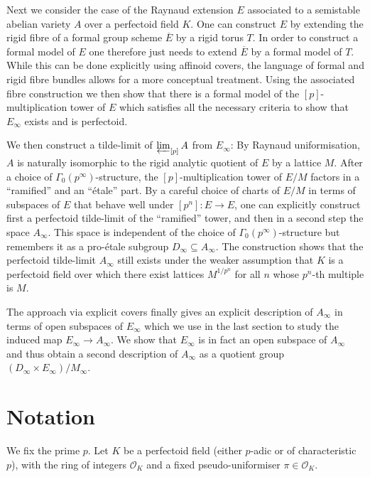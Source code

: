\documentclass[10pt,oneside]{amsart}
\theoremstyle{definition}
\begin{document}
Next we consider the case of the Raynaud extension $E$ associated to a semistable abelian variety $A$ over a perfectoid field $K$. One can construct $E$ by extending the rigid fibre of a formal group scheme $\overline{E}$ by a rigid torus $T$. In order to construct a formal model of $E$ one therefore just needs to extend $\overline{E}$ by a formal model of $T$. While this can be done explicitly using affinoid covers, the language of formal and rigid fibre bundles allows for a more conceptual treatment. Using the associated fibre construction we then show that there is a formal model of the $[p]$-multiplication tower of $E$ which satisfies all the necessary criteria to show that $E_\infty$ exists and is perfectoid.  

We then construct a tilde-limit of $\varprojlim_{[p]} A$ from $E_\infty$: By Raynaud uniformisation, $A$ is naturally isomorphic to the rigid analytic quotient of $E$ by a lattice $M$. After a choice of $\Gamma_0(p^\infty)$-structure, the $[p]$-multiplication tower of $E/M$ factors in a ``ramified'' and an ``\'etale'' part. By a careful choice of charts of $E/M$ in terms of subspaces of $E$ that behave well under $[p^n]:E\rightarrow E$, one can explicitly construct first a perfectoid tilde-limit of the ``ramified'' tower, and then in a second step the space $A_\infty$. This space is independent of the choice of $\Gamma_0(p^\infty)$-structure but remembers it as a pro-\'etale subgroup $D_\infty \subseteq A_\infty$. The construction shows that the perfectoid tilde-limit $A_\infty$ still exists under the weaker assumption that $K$ is a perfectoid field over which there exist lattices $M^{1/p^n}$ for all $n$ whose $p^n$-th multiple is $M$.

The approach via explicit covers finally gives an explicit description of $A_\infty$ in terms of open subspaces of $E_\infty$ which we use in the last section to study the induced map $E_\infty\rightarrow A_\infty$. We show that $E_\infty$ is in fact an open subspace of $A_\infty$ and thus obtain a second description of $A_\infty$ as a quotient group $(D_\infty\times E_\infty)/M_\infty$.


\newpage





\section*{Notation}
	We fix the prime $p$.  Let $K$ be a perfectoid field (either $p$-adic or of characteristic $p$), with the ring of integers  $\mathcal O_K$  and  a fixed pseudo-uniformiser $\pi\in \mathcal O_K$. 
	
\end{document}
